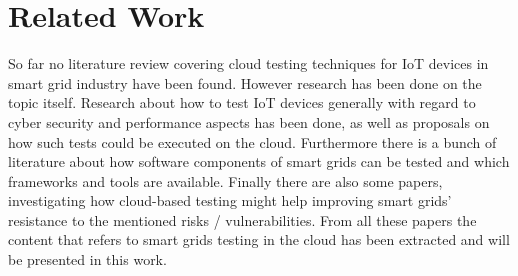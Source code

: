 \section{Related Work}
So far no literature review covering cloud testing techniques for IoT devices in smart grid industry have been found. However research has been done on the topic itself. Research about how to test IoT devices generally with regard to cyber security and performance aspects has been done, as well as proposals on how such tests could be executed on the cloud. Furthermore there is a bunch of literature about how software components of smart grids can be tested and which frameworks and tools are available. Finally there are also some papers, investigating how cloud-based testing might help improving smart grids' resistance to the mentioned risks / vulnerabilities. From all these papers the content that refers to smart grids testing in the cloud has been extracted and will be presented in this work.
